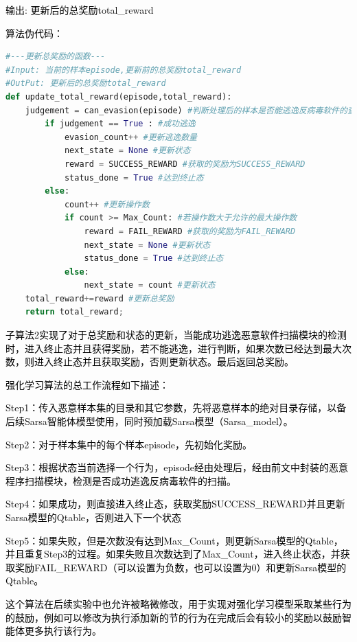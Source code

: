 \textcolor{black}{输出: 更新后的总奖励total\_reward}

\textcolor{black}{算法伪代码：}

\begin{lstlisting}[language=Python, caption={}, label={lst:pythonfile3}]
#---更新总奖励的函数---
#Input: 当前的样本episode,更新前的总奖励total_reward
#OutPut: 更新后的总奖励total_reward
def update_total_reward(episode,total_reward):
    judgement = can_evasion(episode) #判断处理后的样本是否能逃逸反病毒软件的查杀
        if judgement == True : #成功逃逸
            evasion_count++ #更新逃逸数量
            next_state = None #更新状态
            reward = SUCCESS_REWARD #获取的奖励为SUCCESS_REWARD
            status_done = True #达到终止态
        else:
            count++ #更新操作数
            if count >= Max_Count: #若操作数大于允许的最大操作数
                reward = FAIL_REWARD #获取的奖励为FAIL_REWARD
                next_state = None #更新状态
                status_done = True #达到终止态
            else:
                next_state = count #更新状态
    total_reward+=reward #更新总奖励
    return total_reward; 
\end{lstlisting}

\textcolor{black}{子算法2实现了对于总奖励和状态的更新，当能成功逃逸恶意软件扫描模块的检测时，进入终止态并且获得奖励，若不能逃逸，进行判断，如果次数已经达到最大次数，则进入终止态并且获取奖励，否则更新状态。最后返回总奖励。}

\textcolor{black}{强化学习算法的总工作流程如下描述：}

\textcolor{black}{Step1：传入恶意样本集的目录和其它参数，先将恶意样本的绝对目录存储，以备后续Sarsa智能体模型使用，同时预加载Sarsa模型（Sarsa\_model）。}

\textcolor{black}{Step2：对于样本集中的每个样本episode，先初始化奖励。}

\textcolor{black}{Step3：根据状态当前选择一个行为，episode经由处理后，经由前文中封装的恶意程序扫描模块，检测是否成功逃逸反病毒软件的扫描。}

\textcolor{black}{Step4：如果成功，则直接进入终止态，获取奖励SUCCESS\_REWARD并且更新Sarsa模型的Qtable，否则进入下一个状态}

\textcolor{black}{Step5：如果失败，但是次数没有达到Max\_Count，则更新Sarsa模型的Qtable，并且重复Step3的过程。如果失败且次数达到了Max\_Count，进入终止状态，并获取奖励FAIL\_REWARD（可以设置为负数，也可以设置为0）和更新Sarsa模型的Qtable。}

\textcolor{black}{这个算法在后续实验中也允许被略微修改，用于实现对强化学习模型采取某些行为的鼓励，例如可以修改为执行添加新的节的行为在完成后会有较小的奖励以鼓励智能体更多执行该行为。}

